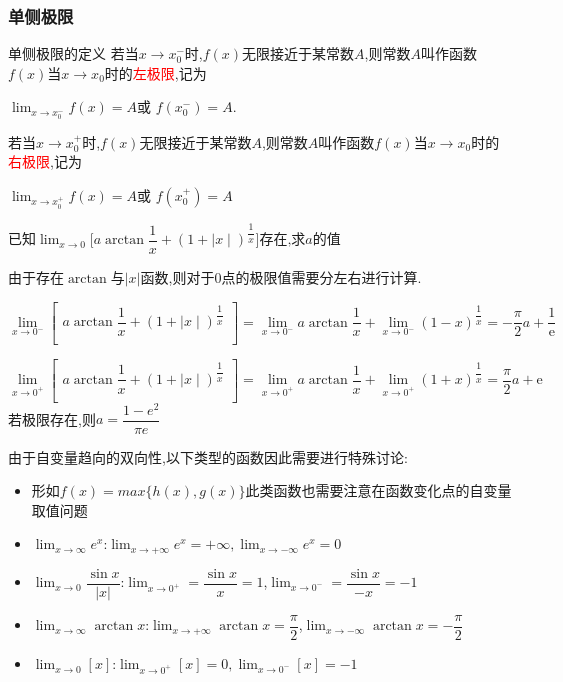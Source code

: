 \documentclass[8pt a4paper, oneside, UTF8]{ctexbook}
\begin{document}
\begin{sloppypar}
    \subsubsection{单侧极限}
    \begin{defn}{单侧极限的定义}{}
        若当$x\to x_0^{-}$时,$f(x)$无限接近于某常数$A$,则常数$A$叫作函数$f(x)$当$x\to x_0$时的\textcolor{red}{左极限},记为
        \begin{center}
            $\operatorname*{lim}_{x\to x_0^{-}}f(x)=A$或 $f(x_0^{-})=A$.
        \end{center}
        若当$x\to x_0^+$时,$f(x)$无限接近于某常数$A$,则常数$A$叫作函数$f(x)$当$x\to x_0$时的\textcolor{red}{右极限},记为
        \begin{center}
            $\operatorname*{lim}_{x\to x_0^{+}}f(x)=A$或 $f(x_0^{+})=A$
        \end{center}
    \end{defn}
    \begin{problem}
    $\text{已知}\lim_{x\to0}\biggl[a\arctan\dfrac{1}{x}+(1+\mid x\mid)^{\dfrac{1}{x}}\biggr]\text{存在,求}a\text{的值}$
    \end{problem}
    \begin{solution}
        由于存在$\arctan$与$|x|$函数,则对于0点的极限值需要分左右进行计算.

        $\lim\limits_{x\to0^{-}}\left[\begin{matrix}a\arctan\dfrac{1}{x}+(1+\mid x\mid)^{\dfrac{1}{x}}\\\end{matrix}\right]=\lim\limits_{x\to0^{-}}a\arctan\dfrac{1}{x}+\lim\limits_{x\to0^{-}}(1-x)^{\dfrac{1}{x}}=-\dfrac{\pi}{2}a+\dfrac{1}{\text{e}}$

        $\lim\limits_{x\to0^+}\left[\begin{matrix}a\arctan\dfrac{1}{x}+(1+\mid x\mid)^{\dfrac{1}{x}}\\\end{matrix}\right]=\lim\limits_{x\to0^+}a\arctan\dfrac{1}{x}+\lim\limits_{x\to0^+}(1+x)^{\dfrac{1}{x}}=\dfrac{\pi}{2}a+\mathrm{e}$
        若极限存在,则$a=\dfrac{1-e^2}{\pi e}$
    \end{solution}
    \begin{note}
        由于自变量趋向的双向性,以下类型的函数因此需要进行特殊讨论:
        \begin{itemize}
            \item 形如$f(x)=max\{h(x),g(x)\}$此类函数也需要注意在函数变化点的自变量取值问题
            \item $\lim_{x \to \infty}e^x$:$\lim _{x \to +\infty}e^x=+\infty,
                      \lim _{x \to -\infty}e^x=0$
            \item $\lim_{x \to 0} \dfrac{\sin x}{|x|}$:$\lim_{x \to 0^+}=\dfrac{\sin x}{x}=1$,$\lim_{x \to 0^-}=\dfrac{\sin x}{-x}=-1$
            \item $\lim_{x \to \infty }\arctan x$:$\lim_{x \to +\infty}\arctan x=\dfrac{\pi}{2}$,$\lim_{x \to -\infty}\arctan x= -\dfrac{\pi}{2}$
            \item $\lim_{x \to 0}[x]$:$\lim _{x \to 0^+}[x]=0,\lim_{x \to 0^-}[x]=-1$
        \end{itemize}
    \end{note}

\end{sloppypar}
\end{document}
